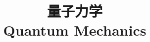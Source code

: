 \documentclass{../thunote}
\begin{document}
\title{量子力学\\Quantum Mechanics}
\maketitle

\frontmatter
\tableofcontents

\mainmatter
% 









\end{document}
